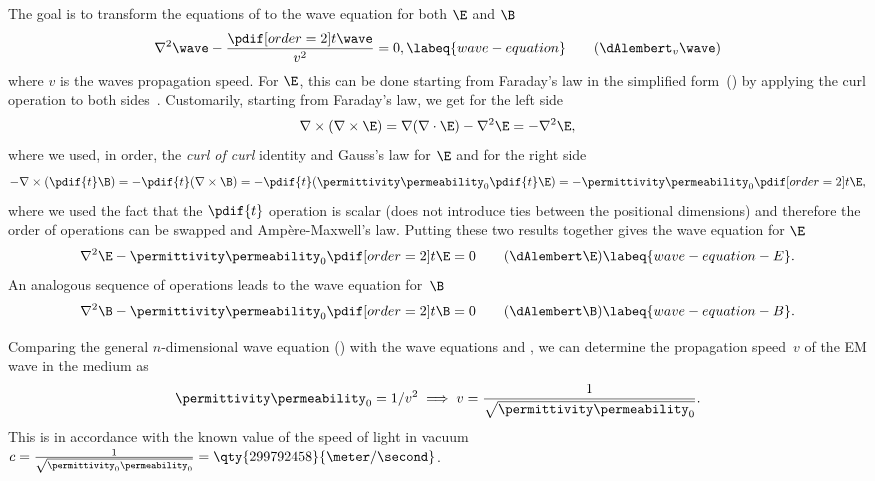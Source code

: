 The goal is to transform the equations of  to the wave equation for both \(\E\) and \(\B\)
    \begin{equation*}
        \nabla^2 \wave - \frac{\pdif[order={2}]{t}\wave}{v^2} = 0,
        \labeq{wave-equation}\tag{\(\dAlembert_{v}\wave\)}
    \end{equation*}
    where \(v\) is the waves propagation speed.
For \(\E\), this can be done starting from Faraday's law in the simplified form~() by 
    applying the curl operation to both sides~.
Customarily, starting from Faraday's law, we get for the left side
    \begin{equation*}
      \nabla \times (\nabla \times \E) = \nabla(\nabla\cdot\E) - \nabla^2\E = - \nabla^2\E,
    \end{equation*}
    where we used, in order, the \emph{curl of curl} identity and Gauss's law for \(\E\) and for the right side
    \begin{equation*}
        -\nabla\times(\pdif{t}\B) = - \pdif{t}(\nabla \times \B) = - \pdif{t}(\permittivity
        \permeability_0 \pdif{t} \E) = - \permittivity \permeability_0 \pdif[order={2}]{t} \E,
    \end{equation*}
    where we used the fact that the \(\pdif{t}\) operation is scalar (does not introduce ties between the positional
    dimensions) and therefore the order of operations can be swapped and Ampère-Maxwell's law.
Putting these two results together gives the wave equation for \(\E\)
    \begin{equation}
        \nabla^2\E - \permittivity \permeability_0 \pdif[order={2}]{t}\E = 0 \tag{\(\dAlembert\E\)}\labeq{wave-equation-E}. 
    \end{equation}
An analogous sequence of operations leads to the wave equation for~\(\B\)
    \begin{equation}
        \nabla^2\B - \permittivity \permeability_0 \pdif[order={2}]{t}\B = 0 \tag{\dAlembert\B}\labeq{wave-equation-B}.
    \end{equation}

Comparing the general \(n\)-dimensional wave equation () with the wave equations 
     and , we can determine the propagation speed~\(v\) of the 
    \ac{EM} wave in the medium as
    \begin{equation}
           \permittivity \permeability_0 = 1/v^2 \implies v = \frac{1}{\sqrt{\permittivity\permeability_0}}.
    \end{equation}
This is in accordance with the known value of the speed of light in vacuum \(c
    = \frac{1}{\sqrt{\permittivity_0\permeability_0}} = \qty{299 792 458}{\meter/\second}\).


